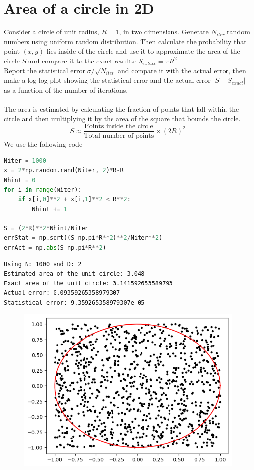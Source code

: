 \documentclass{article}
\begin{document}
\section{Area of a circle in 2D}
Consider a circle of unit radius, $R=1$, in two dimensions. Generate $N_{iter}$ random numbers using uniform random distribution. Then calculate the probability that point $(x,y)$ lies inside of the circle and use it to approximate the area of the circle $S$ and compare it to the exact results: $S_{extact}=\pi R^2$.\\
Report the statistical error $\sigma/\sqrt{N_{iter}}$ and compare it with the actual error, then make a log-log plot showing the statistical error and the actual error $|S-S_{exact}|$ as a function of the number of iterations.\\\\
The area is estimated by calculating the fraction of points that fall within the circle and then multiplying it by the area of the square that bounds the circle.
\begin{equation}
    S\approx\frac{\text{Points inside the circle}}{\text{Total number of points}}\times(2R)^2
\end{equation}
We use the following code 
\begin{lstlisting}[language=Python]
Niter = 1000
x = 2*np.random.rand(Niter, 2)*R-R
Nhint = 0
for i in range(Niter):
    if x[i,0]**2 + x[i,1]**2 < R**2:
        Nhint += 1

S = (2*R)**2*Nhint/Niter
errStat = np.sqrt((S-np.pi*R**2)**2/Niter**2)
errAct = np.abs(S-np.pi*R**2)
\end{lstlisting}
\begin{lstlisting}
Using N: 1000 and D: 2
Estimated area of the unit circle: 3.048
Exact area of the unit circle: 3.141592653589793
Actual error: 0.09359265358979307
Statistical error: 9.359265358979307e-05
\end{lstlisting}
\begin{figure}[H]
    \centering
    \includegraphics[width=.7\linewidth]{images/Figure1.png}
    \caption{}
    \label{fig:1}
\end{figure}
\end{document}
